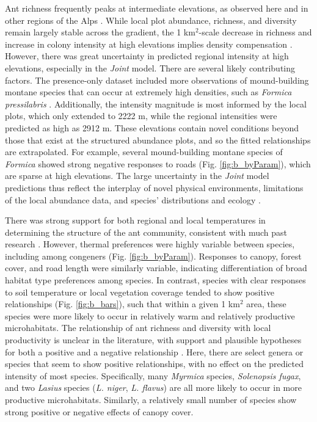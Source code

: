 \documentclass[preprint,final,times,12pt,3p]{elsarticle}
\begin{document}
Ant richness frequently peaks at intermediate elevations, as observed here and in other regions of the Alps \citep{Hellrigl2003,Glaser2006,SzewczykMcCain2016}. While local plot abundance, richness, and diversity remain largely stable across the gradient, the 1 km$^2$-scale decrease in richness and increase in colony intensity at high elevations implies density compensation \citep{LongColw2011}. However, there was great uncertainty in predicted regional intensity at high elevations, especially in the \emph{Joint} model. There are several likely contributing factors. The presence-only dataset included more observations of mound-building montane species that can occur at extremely high densities, such as \emph{Formica pressilabris} \citep{Seifert2018}. Additionally, the intensity magnitude is most informed by the local plots, which only extended to 2222 m, while the regional intensities were predicted as high as 2912 m. These elevations contain novel conditions beyond those that exist at the structured abundance plots, and so the fitted relationships are extrapolated. For example, several mound-building montane species of \emph{Formica} showed strong negative responses to roads (Fig. \ref{fig:b_byParam}), which are sparse at high elevations. The large uncertainty in the \emph{Joint} model predictions thus reflect the interplay of novel physical environments, limitations of the local abundance data, and species' distributions and ecology \citep{Harris2018,Guillera-Arroita2019}. 

There was strong support for both regional and local temperatures in determining the structure of the ant community, consistent with much past research \citep{SandersEtAl2007,Penick2017,Bishop2016,SzewczykMcCain2016,Szewczyk2018}. However, thermal preferences were highly variable between species, including among congeners (Fig. \ref{fig:b_byParam}). Responses to canopy, forest cover, and road length were similarly variable, indicating differentiation of broad habitat type preferences among species. In contrast, species with clear responses to soil temperature or local vegetation coverage tended to show positive relationships (Fig. \ref{fig:b_bars}), such that within a given 1 km$^2$ area, these species were more likely to occur in relatively warm and relatively productive microhabitats. The relationship of ant richness and diversity with local productivity is unclear in the literature, with support and plausible hypotheses for both a positive and a negative relationship \citep{Andersen1986,LassauHochuli2004,Queiroz2016}. Here, there are select genera or species that seem to show positive relationships, with no effect on the predicted intensity of most species. Specifically, many \emph{Myrmica} species, \emph{Solenopsis fugax}, and two \emph{Lasius} species (\emph{L. niger}, \emph{L. flavus}) are all more likely to occur in more productive microhabitats. Similarly, a relatively small number of species show strong positive or negative effects of canopy cover. 
\end{document}
